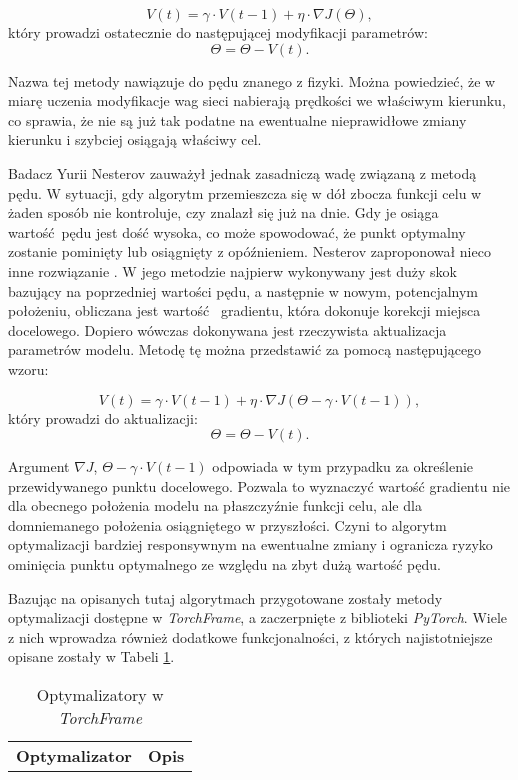\begin{enumerate}
    \[V(t)=\gamma \cdot V(t - 1) + \eta \cdot \nabla J(\Theta),\]
    który prowadzi ostatecznie do następującej modyfikacji parametrów:
    \[\Theta = \Theta - V(t).\]

    Nazwa tej metody nawiązuje do pędu znanego z fizyki. Można powiedzieć, że
    w miarę uczenia modyfikacje wag sieci nabierają prędkości we właściwym kierunku, co
    sprawia, że nie są już tak podatne na ewentualne nieprawidłowe zmiany kierunku i
    szybciej osiągają właściwy cel.

    Badacz Yurii Nesterov zauważył jednak zasadniczą wadę związaną z metodą pędu.
    W sytuacji, gdy algorytm przemieszcza się w dół zbocza funkcji celu w żaden
    sposób nie kontroluje, czy znalazł się już na dnie. Gdy je osiąga wartość pędu
    jest dość wysoka, co może spowodować, że punkt optymalny zostanie pominięty
    lub osiągnięty z opóźnieniem. Nesterov zaproponował nieco inne rozwiązanie \cite{Nesterov_momentum}.
    W jego metodzie najpierw wykonywany jest duży skok bazujący na poprzedniej
    wartości pędu, a następnie w nowym, potencjalnym położeniu, obliczana jest wartość 
    gradientu, która dokonuje korekcji miejsca docelowego. Dopiero wówczas dokonywana
    jest rzeczywista aktualizacja parametrów modelu. Metodę tę można przedstawić za
    pomocą następującego wzoru:

    \[V(t)=\gamma \cdot V(t - 1) + \eta \cdot \nabla J(\Theta - \gamma \cdot V(t - 1)),\]
    który prowadzi do aktualizacji:
    \[\Theta = \Theta - V(t).\]

    Argument $\nabla J$, $\Theta - \gamma \cdot V(t - 1)$ odpowiada w tym przypadku za określenie przewidywanego punktu docelowego.
    Pozwala to wyznaczyć wartość gradientu nie dla obecnego położenia modelu na płaszczyźnie
    funkcji celu, ale dla domniemanego położenia osiągniętego w przyszłości. Czyni to
    algorytm optymalizacji bardziej responsywnym na ewentualne zmiany i ogranicza ryzyko
    ominięcia punktu optymalnego ze względu na zbyt dużą wartość pędu.

    Bazując na opisanych tutaj algorytmach przygotowane zostały metody optymalizacji
    dostępne w \textit{TorchFrame}, a zaczerpnięte z biblioteki \textit{PyTorch}. Wiele z nich wprowadza
    również dodatkowe funkcjonalności, z których najistotniejsze opisane zostały w Tabeli \ref{tab:optimizers}.

    \begin{longtable}{ |m{3cm}|m{10cm}| }
      \caption{Optymalizatory w \textit{TorchFrame}}
      \label{tab:optimizers}
      \endfirsthead
      \endhead
     \hline
       \textbf{Optymalizator} & \textbf{Opis} \\


\end{longtable}
\end{enumerate}
